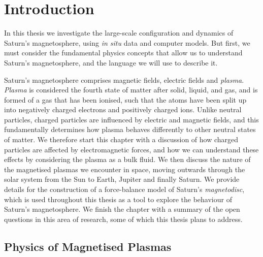 \chapter{Introduction}
\label{chap:intro}
In this thesis we investigate the large-scale configuration and dynamics of Saturn's magnetosphere, using \textit{in situ} data and computer models. But first, we must consider the fundamental physics concepts that allow us to understand Saturn's magnetosphere, and the language we will use to describe it. 

Saturn's magnetosphere comprises magnetic fields, electric fields and \textit{plasma}. \textit{Plasma} is considered the fourth state of matter after solid, liquid, and gas, and is formed of a gas that has been ionised, such that the atoms have been split up into negatively charged electrons and positively charged ions. Unlike neutral particles, charged particles are influenced by electric and magnetic fields, and this fundamentally determines how plasma behaves differently to other neutral states of matter. We therefore start this chapter with a discussion of how charged particles are affected by electromagnetic forces, and how we can understand these effects by considering the plasma as a bulk fluid. We then discuss the nature of the magnetised plasmas we encounter in space, moving outwards through the solar system from the Sun to Earth, Jupiter and finally Saturn. We provide details for the construction of a force-balance model of Saturn's \textit{magnetodisc}, which is used throughout this thesis as a tool to explore the behaviour of Saturn's magnetosphere. We finish the chapter with a summary of the open questions in this area of research, some of which this thesis plans to address.

\section{Physics of Magnetised Plasmas}
